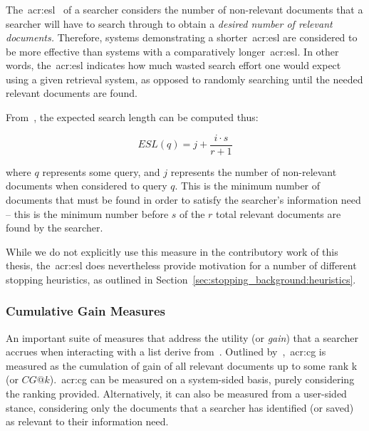 \subsubsection{}\label{sec:ir_background:evaluation:system:esl}
The~\gls{acr:esl}~\citep{cooper1968expected_search_length} of a searcher considers the number of non-relevant documents that a searcher will have to search through to obtain a \emph{desired number of relevant documents.} Therefore, systems demonstrating a shorter~\gls{acr:esl} are considered to be more effective than systems with a comparatively longer~\gls{acr:esl}. In other words, the~\gls{acr:esl} indicates how much wasted search effort one would expect using a given retrieval system, as opposed to randomly searching until the needed relevant documents are found.

From~\cite{cooper1968expected_search_length}, the expected search length can be computed thus:

\begin{equation*}
ESL(q) = j + \frac{i \cdot s}{r + 1}
\end{equation*}

\noindent
where $q$ represents some query, and $j$ represents the number of non-relevant documents when considered to query $q$. This is the minimum number of documents that must be found in order to satisfy the searcher's information need -- this is the minimum number before $s$ of the $r$ total relevant documents are found by the searcher.

While we do not explicitly use this measure in the contributory work of this thesis, the~\gls{acr:esl} does nevertheless provide motivation for a number of different stopping heuristics, as outlined in Section~\ref{sec:stopping_background:heuristics}.

\subsubsection{Cumulative Gain Measures}\label{sec:ir_background:evaluation:system:cg}
An important suite of measures that address the utility (or \emph{gain}) that a searcher accrues when interacting with a list derive from~. Outlined by~\cite{jarvelin2000cg, jarvelin2002cg},~\gls{acr:cg} is measured as the cumulation of gain of all relevant documents up to some rank k (or $CG@k$).~\gls{acr:cg} can be measured on a system-sided basis, purely considering the ranking provided. Alternatively, it can also be measured from a user-sided stance, considering only the documents that a searcher has identified (or saved) as relevant to their information need.


